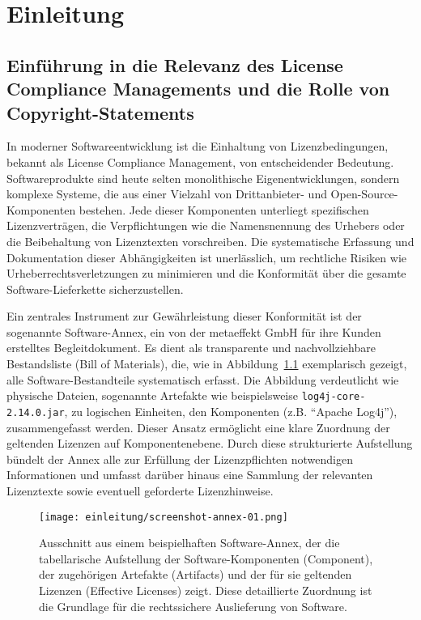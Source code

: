 \chapter{Einleitung}\label{ch:einleitung}


\section{Einführung in die Relevanz des License Compliance Managements und die Rolle von Copyright-Statements}\label{sec:einfuhrung}

In moderner Softwareentwicklung ist die Einhaltung von Lizenzbedingungen, bekannt als License Compliance Management, von entscheidender Bedeutung.
Softwareprodukte sind heute selten monolithische Eigenentwicklungen, sondern komplexe Systeme, die aus einer Vielzahl von Drittanbieter- und Open-Source-Komponenten bestehen.
Jede dieser Komponenten unterliegt spezifischen Lizenzverträgen, die Verpflichtungen wie die Namensnennung des Urhebers oder die Beibehaltung von Lizenztexten vorschreiben.
Die systematische Erfassung und Dokumentation dieser Abhängigkeiten ist unerlässlich, um rechtliche Risiken wie Urheberrechtsverletzungen zu minimieren und die Konformität über die gesamte Software-Lieferkette sicherzustellen.

Ein zentrales Instrument zur Gewährleistung dieser Konformität ist der sogenannte Software-Annex, ein von der metaeffekt GmbH für ihre Kunden erstelltes Begleitdokument.
Es dient als transparente und nachvollziehbare Bestandsliste (Bill of Materials), die, wie in Abbildung~\ref{fig:annex-01} exemplarisch gezeigt, alle Software-Bestandteile systematisch erfasst.
Die Abbildung verdeutlicht wie physische Dateien, sogenannte Artefakte wie beispielsweise \texttt{log4j-core-2.14.0.jar}, zu logischen Einheiten, den Komponenten (z.B. \enquote{Apache Log4j}), zusammengefasst werden.
Dieser Ansatz ermöglicht eine klare Zuordnung der geltenden Lizenzen auf Komponentenebene.
Durch diese strukturierte Aufstellung bündelt der Annex alle zur Erfüllung der Lizenzpflichten notwendigen Informationen und umfasst darüber hinaus eine Sammlung der relevanten Lizenztexte sowie eventuell geforderte Lizenzhinweise.

\begin{figure}[ht]
    \centering
    \texttt{[image: einleitung/screenshot-annex-01.png]}
    \caption{Ausschnitt aus einem beispielhaften Software-Annex, der die tabellarische Aufstellung der Software-Komponenten (Component), der zugehörigen Artefakte (Artifacts) und der für sie geltenden Lizenzen (Effective Licenses) zeigt. Diese detaillierte Zuordnung ist die Grundlage für die rechtssichere Auslieferung von Software.}
    \label{fig:annex-01}
\end{figure}

